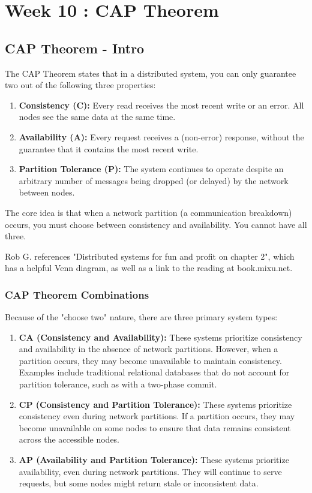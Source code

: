 \section{Week 10 : CAP Theorem}

\subsection{CAP Theorem - Intro}
The CAP Theorem states that in a distributed system, you can only guarantee two out of the following three properties:

\begin{enumerate}[itemsep=1pt, topsep=1pt]
\item \textbf{Consistency (C):} Every read receives the most recent write or an error. All nodes see the same data at the same time.
\item \textbf{Availability (A):} Every request receives a (non-error) response, without the guarantee that it contains the most recent write.
\item \textbf{Partition Tolerance (P):} The system continues to operate despite an arbitrary number of messages being dropped (or delayed) by the network between nodes.
\end{enumerate}

\noindent The core idea is that when a network partition (a communication breakdown) occurs, you must choose between consistency and availability. You cannot have all three.

Rob G. references "Distributed systems for fun and profit on chapter 2", which has a helpful Venn diagram, as well as a link to the reading at book.mixu.net.

\subsubsection{CAP Theorem Combinations}
Because of the "choose two" nature, there are three primary system types:

\begin{enumerate}[itemsep=1pt, topsep=1pt]
\item \textbf{CA (Consistency and Availability):} These systems prioritize consistency and availability in the absence of network partitions. However, when a partition occurs, they may become unavailable to maintain consistency. Examples include traditional relational databases that do not account for partition tolerance, such as with a two-phase commit.
\item \textbf{CP (Consistency and Partition Tolerance):} These systems prioritize consistency even during network partitions. If a partition occurs, they may become unavailable on some nodes to ensure that data remains consistent across the accessible nodes.
\item \textbf{AP (Availability and Partition Tolerance):} These systems prioritize availability, even during network partitions. They will continue to serve requests, but some nodes might return stale or inconsistent data.
\end{enumerate}

